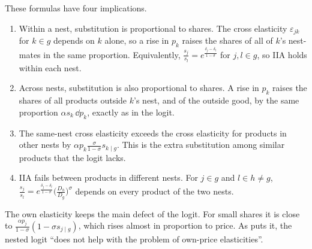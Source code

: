 These formulas have four implications.
\begin{enumerate}[label=(\alph*)]
  \item Within a nest, substitution is proportional to shares. The cross elasticity $\varepsilon_{jk}$ for
  $k \in g$ depends on $k$ alone, so a rise in $p_k$ raises the shares of all of $k$'s nest-mates in the same
  proportion. Equivalently, $\frac{s_j}{s_l} = e^{\frac{\delta_j - \delta_l}{1-\sigma}}$ for $j, l \in g$, so IIA holds
  within each nest.
  \item Across nests, substitution is also proportional to shares. A rise in $p_k$ raises the shares of all
  products outside $k$'s nest, and of the outside good, by the same proportion $\alpha s_k\,\dd p_k$, exactly as in
  the logit.
  \item The same-nest cross elasticity exceeds the cross elasticity for products in other nests by
  $\alpha p_k\frac{\sigma}{1-\sigma}s_{k \mid g}$. This is the extra substitution among similar products that the
  logit lacks.
  \item IIA fails between products in different nests. For $j \in g$ and $l \in h \neq g$,
  $\frac{s_j}{s_l} = e^{\frac{\delta_j - \delta_l}{1-\sigma}}\big(\frac{D_h}{D_g}\big)^{\sigma}$ depends on every product of
  the two nests.
\end{enumerate}
The own elasticity keeps the main defect of the logit. For small shares it is close to
$\frac{\alpha p_j}{1-\sigma}(1 - \sigma s_{j \mid g})$, which rises almost in proportion to price. As
\citet[p.~524]{Nevo2000a} puts it, the nested logit ``does not help with the problem of own-price elasticities''.

